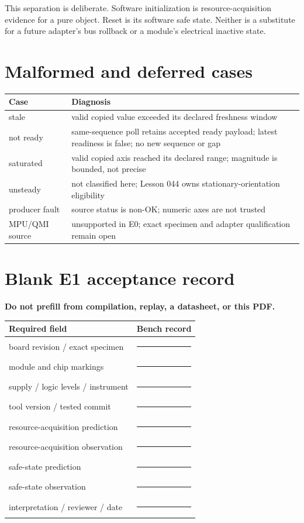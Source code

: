 \documentclass[11pt]{article}
\newcommand{\blankline}{\rule{0.9in}{0.4pt}}
\begin{document}
This separation is deliberate. Software initialization is resource-acquisition
evidence for a pure object. Reset is its software safe state. Neither is a
substitute for a future adapter's bus rollback or a module's electrical
inactive state.

\section{Malformed and deferred cases}
\begin{tabularx}{\linewidth}{@{}l X@{}}
\toprule
Case & Diagnosis\\
\midrule
stale & valid copied value exceeded its declared freshness window\\
not ready & same-sequence poll retains accepted ready payload; latest readiness is false; no new sequence or gap\\
saturated & valid copied axis reached its declared range; magnitude is bounded, not precise\\
unsteady & not classified here; Lesson 044 owns stationary-orientation eligibility\\
producer fault & source status is non-OK; numeric axes are not trusted\\
MPU/QMI source & unsupported in E0; exact specimen and adapter qualification remain open\\
\bottomrule
\end{tabularx}

\section{Blank E1 acceptance record}
\textbf{Do not prefill from compilation, replay, a datasheet, or this PDF.}

\begin{tabularx}{\linewidth}{@{}l X@{}}
\toprule
Required field & Bench record\\
\midrule
board revision / exact specimen & \blankline\\[7pt]
module and chip markings & \blankline\\[7pt]
supply / logic levels / instrument & \blankline\\[7pt]
tool version / tested commit & \blankline\\[7pt]
resource-acquisition prediction & \blankline\\[7pt]
resource-acquisition observation & \blankline\\[7pt]
safe-state prediction & \blankline\\[7pt]
safe-state observation & \blankline\\[7pt]
interpretation / reviewer / date & \blankline\\
\bottomrule
\end{tabularx}
\end{document}
